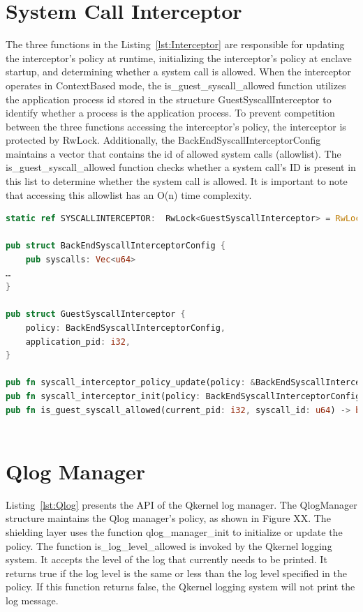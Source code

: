 \section{System Call Interceptor}
The three functions in the Listing~\ref{lst:Interceptor} are responsible for updating the interceptor’s policy at runtime, initializing the interceptor’s policy at enclave startup, and determining whether a system call is allowed. When the interceptor operates in ContextBased mode, 
the is\_guest\_syscall\_allowed function utilizes the application process id stored in the structure GuestSyscallInterceptor to identify whether a process is the application process. To prevent competition between the three functions accessing the interceptor's policy, the interceptor is 
protected by RwLock. Additionally, the BackEndSyscallInterceptorConfig maintains a vector that contains the id of allowed system calls (allowlist). The is\_guest\_syscall\_allowed function checks whether a system call's ID is present in this list to determine whether the system call is allowed. 
It is important to note that accessing this allowlist has an O(n) time complexity.

\begin{lstlisting}[language=rust, caption= API of system call interceptor, label={lst:Interceptor}]
static ref SYSCALLINTERCEPTOR:  RwLock<GuestSyscallInterceptor> = RwLock::new(GuestSyscallInterceptor::default());

pub struct BackEndSyscallInterceptorConfig {
    pub syscalls: Vec<u64>
…
}

pub struct GuestSyscallInterceptor {
    policy: BackEndSyscallInterceptorConfig,
    application_pid: i32,
}

pub fn syscall_interceptor_policy_update(policy: &BackEndSyscallInterceptorConfig) -> Result<()> 
pub fn syscall_interceptor_init(policy: BackEndSyscallInterceptorConfig) -> Result<()> 
pub fn is_guest_syscall_allowed(current_pid: i32, syscall_id: u64) -> bool
    
\end{lstlisting}


\section{Qlog Manager}

Listing~\ref{lst:Qlog} presents the API of the Qkernel log manager. The QlogManager structure maintains the Qlog manager's policy, as shown in Figure XX. The shielding layer uses the function  qlog\_manager\_init to initialize or update the policy. The function is\_log\_level\_allowed  is invoked by 
the Qkernel logging system. It accepts the level of the log that currently needs to be printed. It returns true if the log level is the same or less than the log level specified in the policy. If this function returns false, the Qkernel logging system will not print the log message.

